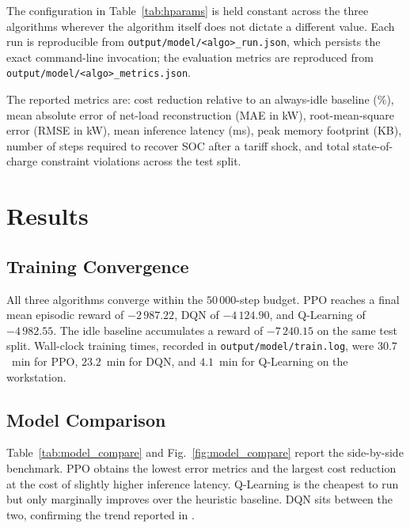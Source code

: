 \documentclass[conference]{IEEEtran}
\begin{document}
The configuration in Table~\ref{tab:hparams} is held constant across the three algorithms wherever the algorithm itself does not dictate a different value. Each run is reproducible from \texttt{output/model/<algo>\_run.json}, which persists the exact command-line invocation; the evaluation metrics are reproduced from \texttt{output/model/<algo>\_metrics.json}.

The reported metrics are: cost reduction relative to an always-idle baseline (\%), mean absolute error of net-load reconstruction (MAE in kW), root-mean-square error (RMSE in kW), mean inference latency (ms), peak memory footprint (KB), number of steps required to recover SOC after a tariff shock, and total state-of-charge constraint violations across the test split.

\section{Results}
\label{sec:results}

\subsection{Training Convergence}
\label{ssec:conv}

All three algorithms converge within the $50\,000$-step budget. PPO reaches a final mean episodic reward of $-2\,987.22$, DQN of $-4\,124.90$, and Q-Learning of $-4\,982.55$. The idle baseline accumulates a reward of $-7\,240.15$ on the same test split. Wall-clock training times, recorded in \texttt{output/model/train.log}, were $30.7$~min for PPO, $23.2$~min for DQN, and $4.1$~min for Q-Learning on the workstation.

\subsection{Model Comparison}
\label{ssec:compare}

Table~\ref{tab:model_compare} and Fig.~\ref{fig:model_compare} report the side-by-side benchmark. PPO obtains the lowest error metrics and the largest cost reduction at the cost of slightly higher inference latency. Q-Learning is the cheapest to run but only marginally improves over the heuristic baseline. DQN sits between the two, confirming the trend reported in \cite{zhang2021,chen2023}.
\end{document}
